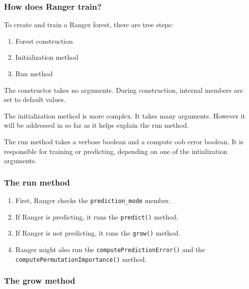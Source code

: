 \documentclass[12pt,oneside]{book}
\begin{document}
\subsubsection{How does Ranger train?}
To create and train a Ranger forest, there are tree steps:
\begin{enumerate}
  \item Forest construction
  \item Initialization method
  \item Run method
\end{enumerate}

The constructor takes no arguments. During construction, internal members are set to default values.

The initialization method is more complex. It takes many arguments. However it will be addressed in so far as it helps explain the run method.

The run method takes a verbose boolean and a compute oob error boolean. It is responsible for training or predicting, depending on one of the intialization arguments.

\subsubsection{The run method}

\begin{enumerate}
  \item First, Ranger checks the \lstinline|prediction_mode| member.
  \item If Ranger is predicting, it runs the \lstinline|predict()| method.
  \item If Ranger is not predicting, it runs the \lstinline|grow()| method.
  \item Ranger might also run the \lstinline|computePredictionError()| and the \lstinline|computePermutationImportance()| method.
\end{enumerate}

\subsubsection{The grow method}
\end{document}
